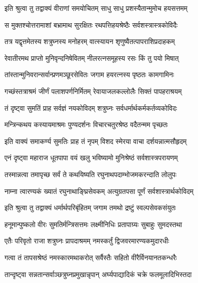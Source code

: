 
\twolineshloka
{इति श्रुत्वा तु तद्वाक्यं वीराणां समयोचितम्}
{साधु साधु प्रशस्यैतान्मुमोच हयसत्तमम्}%

\twolineshloka
{स मुक्तश्चोत्तरामाशां बभ्रामाथ सुरक्षितः}
{रथपत्तिहयश्रेष्ठैः सर्वशस्त्रास्त्रकोविदैः}%

\twolineshloka
{तत्र यद्वृत्तमेतस्य शत्रुघ्नस्य मनोहरम्}
{वात्स्यायन शृणुष्वैतत्पापराशिप्रदाहकम्}%

\twolineshloka
{रेवातीरमथ प्राप्तो मुनिवृन्दनिषेवितम्}
{नीलरत्नसमूहस्य रसः किं तु पयो मिषात्}%

\twolineshloka
{तांस्तान्मुनिवरान्सर्वान्प्रणमञ्छूरसेवितः}
{जगाम हयरत्नस्य पृष्ठतः कामगामिनः}%

\twolineshloka
{गच्छंस्तत्राश्रमं जीर्णं पलाशपर्णनिर्मितम्}
{रेवायाजलकल्लोलैः सिक्तं पापहराश्रयम्}%

\twolineshloka
{तं दृष्ट्वा सुमतिं प्राह सर्वज्ञं नयकोविदम्}
{शत्रुघ्नः सर्वधर्मार्थकर्मकर्तव्यकोविदः}%


\twolineshloka
{मन्त्रिन्कथय कस्यायमाश्रमः पुण्यदर्शनः}
{विचारचतुरश्रेष्ठ वदैतन्मम पृच्छतः}%


\twolineshloka
{इति वाक्यं समाकर्ण्य सुमतिः प्राह तं नृपम्}
{विशद स्मेरया वाचा दर्शयन्नात्मसौहृदम्}%


\twolineshloka
{एनं दृष्ट्वा महाराज धूतपापा वयं खलु}
{भविष्यामो मुनिश्रेष्ठं सर्वशास्त्रपरायणम्}%

\twolineshloka
{तस्मान्नत्वा तमापृच्छ सर्वं ते कथयिष्यति}
{रघुनाथपदाम्भोजमकरन्दाति लोलुपः}%

\twolineshloka
{नाम्ना त्वारण्यकं ख्यातं रघुनाथाङ्घ्रिसेवकम्}
{अत्युग्रतपसा पूर्णं सर्वशास्त्रार्थकोविदम्}%

\twolineshloka
{इति श्रुत्वा तु तद्वाक्यं धर्मार्थपरिबृंहितम्}
{जगाम तमथो द्रष्टुं स्वल्पसेवकसंयुतः}%

\twolineshloka
{हनूमान्पुष्कलो वीरः सुमतिर्मन्त्रिसत्तमः}
{लक्ष्मीनिधिः प्रतापाग्र्यः सुबाहुः सुमदस्तथा}%

\twolineshloka
{एतैः परिवृतो राजा शत्रुघ्नः प्रापदाश्रमम्}
{नमस्कर्तुं द्विजवरमारण्यकमुदारधीः}%

\twolineshloka
{गत्वा तं तापसश्रेष्ठं नमस्कारमथाकरोत्}
{सर्वैस्तैः सहितो वीरैर्विनयानतकन्धरैः}%

\twolineshloka
{तान्दृष्ट्वा सन्नतान्सर्वाञ्छत्रुघ्नप्रमुखान्नृपान्}
{अर्घ्यपाद्यादिकं चक्रे फलमूलादिभिस्तदा}%

